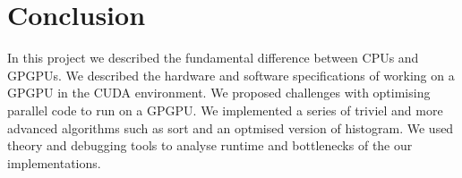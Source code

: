 \chapter{Conclusion}
\label{chap:conclusion}
In this project we described the fundamental difference between CPUs and GPGPUs.
We described the hardware and software specifications of working on a GPGPU in the CUDA environment.
We proposed challenges with optimising parallel code to run on a GPGPU.
We implemented a series of triviel and more advanced algorithms such as sort and an optmised version of histogram.
We used theory and debugging tools to analyse runtime and bottlenecks of the our implementations.
